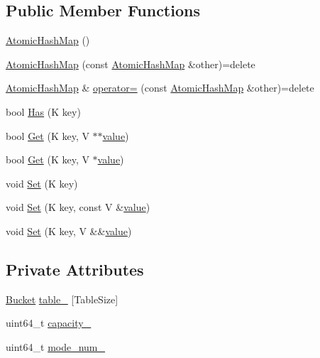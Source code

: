 \subsection*{Public Member Functions}
\begin{DoxyCompactItemize}
\item 
\hyperlink{classapollo_1_1cyber_1_1base_1_1AtomicHashMap_aa1a83359c21d93a096e806382f03e129}{Atomic\-Hash\-Map} ()
\item 
\hyperlink{classapollo_1_1cyber_1_1base_1_1AtomicHashMap_aa27dda760cfb4332fe043d5c23242c20}{Atomic\-Hash\-Map} (const \hyperlink{classapollo_1_1cyber_1_1base_1_1AtomicHashMap}{Atomic\-Hash\-Map} \&other)=delete
\item 
\hyperlink{classapollo_1_1cyber_1_1base_1_1AtomicHashMap}{Atomic\-Hash\-Map} \& \hyperlink{classapollo_1_1cyber_1_1base_1_1AtomicHashMap_a780be857f6f6d0330da564afd8266620}{operator=} (const \hyperlink{classapollo_1_1cyber_1_1base_1_1AtomicHashMap}{Atomic\-Hash\-Map} \&other)=delete
\item 
bool \hyperlink{classapollo_1_1cyber_1_1base_1_1AtomicHashMap_ac038ea2f8018172914fcadb807a970a8}{Has} (K key)
\item 
bool \hyperlink{classapollo_1_1cyber_1_1base_1_1AtomicHashMap_a0cffa9d1d855e4733f18071b0d7a077d}{Get} (K key, V $\ast$$\ast$\hyperlink{namespaceapollo_1_1cyber_1_1base_aa3e2fff9b18a1214af4a70546fb7120f}{value})
\item 
bool \hyperlink{classapollo_1_1cyber_1_1base_1_1AtomicHashMap_a3b8fc8d906e4e6c116c991cd178c8655}{Get} (K key, V $\ast$\hyperlink{namespaceapollo_1_1cyber_1_1base_aa3e2fff9b18a1214af4a70546fb7120f}{value})
\item 
void \hyperlink{classapollo_1_1cyber_1_1base_1_1AtomicHashMap_a9ed2851c909e8ac9662f92d81df18efe}{Set} (K key)
\item 
void \hyperlink{classapollo_1_1cyber_1_1base_1_1AtomicHashMap_a595719e722207e09c63feb85b505ef36}{Set} (K key, const V \&\hyperlink{namespaceapollo_1_1cyber_1_1base_aa3e2fff9b18a1214af4a70546fb7120f}{value})
\item 
void \hyperlink{classapollo_1_1cyber_1_1base_1_1AtomicHashMap_ac4c44e27832b4965f999eeed068938d1}{Set} (K key, V \&\&\hyperlink{namespaceapollo_1_1cyber_1_1base_aa3e2fff9b18a1214af4a70546fb7120f}{value})
\end{DoxyCompactItemize}
\subsection*{Private Attributes}
\begin{DoxyCompactItemize}
\item 
\hyperlink{classapollo_1_1cyber_1_1base_1_1AtomicHashMap_1_1Bucket}{Bucket} \hyperlink{classapollo_1_1cyber_1_1base_1_1AtomicHashMap_aab575e13b07e0465956aeb1aaef42e22}{table\-\_\-} \mbox{[}Table\-Size\mbox{]}
\item 
uint64\-\_\-t \hyperlink{classapollo_1_1cyber_1_1base_1_1AtomicHashMap_ada585ac9c1211917c1d08bf3ef77281f}{capacity\-\_\-}
\item 
uint64\-\_\-t \hyperlink{classapollo_1_1cyber_1_1base_1_1AtomicHashMap_adb15b0fce4c41fa3b25a32b5ba7e23bc}{mode\-\_\-num\-\_\-}
\end{DoxyCompactItemize}


